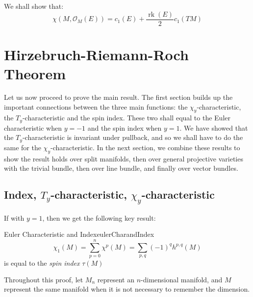 \documentclass{book}
\newcommand{\CO}{{\mathcal{O}}}
\newcommand{\rk}{{\operatorname{rk}}}
\begin{document}
We shall show that:
\[
    \chi(M, \CO_M(E)) = c_1(E) + \frac{\rk(E)}{2}c_1(TM)
\]

\section{Hirzebruch-Riemann-Roch Theorem}\label{sec:HRR}

Let us now proceed to prove the main result. The first section builds up the important connections between the
three main functions: the $\chi_y$-characteristic, the $T_y$-characteristic and the spin index. These two
shall equal to the Euler characteristic when $y=-1$ and the spin index when $y=1$. We have showed that the
$T_y$-characteristic is invariant under pullback, and so we shall have to do the same for the
$\chi_y$-characteristic. In the next section, we combine these results to show the result holds over split
manifolds, then over general projective varieties with the trivial bundle, then over line bundle, and finally
over vector bundles.

\subsection{Index, $T_y$-characteristic, $\chi_y$-characteristic}

If with $y = 1$, then we get the following key result:
\begin{thm}{Euler Characteristic and Index}{eulerCharandIndex}
  \[
  \chi_1(M) = \sum_{p=0}^n \chi^p(M) = \sum_{p,q}(-1)^qh^{p,q}(M)
\]
is equal to the \emph{spin index} $\tau(M)$%
\end{thm}

Throughout this proof, let $M_n$ represent an $n$-dimensional manifold, and $M$ represent the same manifold
when it is not necessary to remember the dimension.
\end{document}
